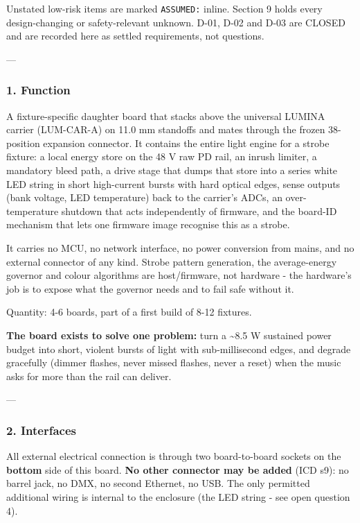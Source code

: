 \documentclass[11pt,a4paper]{article}
\begin{document}
Unstated low-risk items are marked \texttt{ASSUMED:} inline. Section 9 holds every design-changing or safety-relevant unknown. D-01, D-02 and D-03 are CLOSED and are recorded here as settled requirements, not questions.

---

\subsubsection*{1. Function}
A fixture-specific daughter board that stacks above the universal LUMINA carrier (LUM-CAR-A) on 11.0 mm standoffs and mates through the frozen 38-position expansion connector. It contains the entire light engine for a strobe fixture: a local energy store on the 48 V raw PD rail, an inrush limiter, a mandatory bleed path, a drive stage that dumps that store into a series white LED string in short high-current bursts with hard optical edges, sense outputs (bank voltage, LED temperature) back to the carrier's ADCs, an over-temperature shutdown that acts independently of firmware, and the board-ID mechanism that lets one firmware image recognise this as a strobe.

It carries no MCU, no network interface, no power conversion from mains, and no external connector of any kind. Strobe pattern generation, the average-energy governor and colour algorithms are host/firmware, not hardware - the hardware's job is to expose what the governor needs and to fail safe without it.

Quantity: 4-6 boards, part of a first build of 8-12 fixtures.

\textbf{The board exists to solve one problem:} turn a \textasciitilde{}8.5 W sustained power budget into short, violent bursts of light with sub-millisecond edges, and degrade gracefully (dimmer flashes, never missed flashes, never a reset) when the music asks for more than the rail can deliver.

---

\subsubsection*{2. Interfaces}
All external electrical connection is through two board-to-board sockets on the \textbf{bottom} side of this board. \textbf{No other connector may be added} (ICD s9): no barrel jack, no DMX, no second Ethernet, no USB. The only permitted additional wiring is internal to the enclosure (the LED string - see open question 4).
\end{document}
